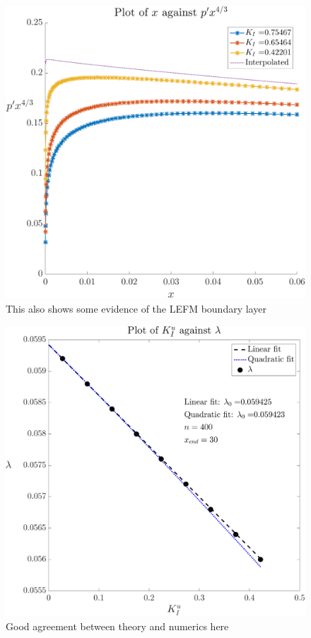 \documentclass{jfm}
\begin{document}
\begin{figure}
  \centerline{\includegraphics[scale=0.3]{./../../Graphs/pprime-x.pdf}}
  \caption{This also shows some evidence of the LEFM boundary layer}
\end{figure}
\begin{figure}
  \centerline{\includegraphics[scale=0.3]{./../../Graphs/l0.pdf}}
  \caption{Good agreement between theory and numerics here}
\end{figure}
\end{document}
